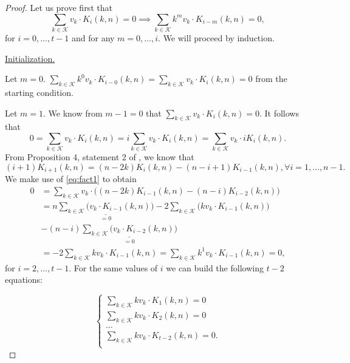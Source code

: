 \begin{proof}
    Let us prove first that
    $$\sum_{k \in \mathcal{K}} v_k \cdot K_i(k, n) = 0 \implies \sum_{k \in \mathcal{K}} k^mv_k \cdot K_{i-m}(k, n) = 0,$$ for $i = 0, \ldots, t-1$ and for any $m = 0, \ldots, i$. We will proceed by induction.

    \underline{Initialization.}

    Let $m = 0$. $\sum_{k \in \mathcal{K}} k^0v_k \cdot K_{i-0}(k, n) = \sum_{k \in \mathcal{K}} v_k \cdot K_i(k, n) = 0$ from the starting condition.

    Let $m = 1$. We know from $m - 1 = 0$ that $\sum_{k \in \mathcal{K}} v_k \cdot K_i(k, n) = 0$. It follows that
    $$
    0 = \sum_{k \in \mathcal{K}} v_k \cdot K_i(k, n) = i\sum_{k \in \mathcal{K}} v_k \cdot K_i(k, n) = \sum_{k \in \mathcal{K}} v_k \cdot iK_i(k, n).
    $$
    From Proposition 4, statement 2 of \cite{DCC:DalMaiSar06}, we know that
    \begin{equation}\label{eq:fact1}
        (i+1)K_{i+1}(k, n) = (n - 2k)K_i(k,n) - (n - i + 1)K_{i-1}(k,n), \forall i = 1, \ldots, n - 1.
    \end{equation}
    We make use of \cref{eq:fact1} to obtain
    \begin{equation*}
    \begin{split}
        0 &= \sum_{k \in \mathcal{K}} v_k \cdot \Big( (n - 2k)K_{i-1}(k, n) - (n - i)K_{i-2}(k, n) \Big)\\
        & = n \underset{=0}{\underline{\sum_{k \in \mathcal{K}} \Big( v_k \cdot K_{i-1}(k, n) \Big)}} - 2\sum_{k \in \mathcal{K}} \Big( kv_k \cdot K_{i-1}(k, n) \Big)\\& - (n-i)\underset{=0}{\underline{\sum_{k \in \mathcal{K}} \Big( v_k \cdot K_{i-2}(k, n) \Big)}}\\
        &= -2\sum_{k \in \mathcal{K}} kv_k \cdot K_{i-1}(k, n) = \sum_{k \in \mathcal{K}} k^1v_k \cdot K_{i-1}(k, n) = 0,
    \end{split}
    \end{equation*}
    for $i = 2, \ldots, t-1$. For the same values of $i$ we can build the following $t-2$ equations:

    \begin{equation*}
        \begin{cases}
            \sum_{k \in \mathcal{K}} kv_k \cdot K_1(k, n) = 0\\
            \sum_{k \in \mathcal{K}} kv_k \cdot K_2(k, n) = 0\\
            \ldots\\
            \sum_{k \in \mathcal{K}} kv_k \cdot K_{t-2}(k, n) = 0.\\
        \end{cases}
    \end{equation*}


\end{proof}
